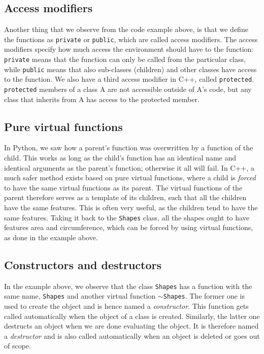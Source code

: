 \subsection{Access modifiers}
Another thing that we observe from the code example above, is that we define the functions as \texttt{private} or \texttt{public}, which are called access modifiers. The access modifiers specify how much access the environment should have to the function: \texttt{private} means that the function can only be called from the particular class, while \texttt{public} means that also sub-classes (children) and other classes have access to the function. We also have a third access modifier in C++, called \texttt{protected}. \texttt{protected} members of a class A are not accessible outside of A's code, but any class that inherits from A has access to the protected member. 

\subsection{Pure virtual functions}
In Python, we saw how a parent's function was overwritten by a function of the child. This works as long as the child's function has an identical name and identical arguments as the parent's function; otherwise it all will fail. In C++, a much safer method exists based on pure virtual functions, where a child is \textit{forced} to have the same virtual functions as its parent. The virtual functions of the parent therefore serves as a template of its children, such that all the children have the same features. This is often very useful, as the children tend to have the same features. Taking it back to the \texttt{Shapes} class, all the shapes ought to have features area and circumference, which can be forced by using virtual functions, as done in the example above. 

\subsection{Constructors and destructors}
In the example above, we observe that the class \texttt{Shapes} has a function with the same name, \texttt{Shapes} and another virtual function $\sim$\texttt{Shapes}. The former one is used to create the object and is hence named a \textit{constructor}. This function gets called automatically when the object of a class is created. Similarly, the latter one destructs an object when we are done evaluating the object. It is therefore named a \textit{destructor} and is also called automatically when an object is deleted or goes out of scope.

